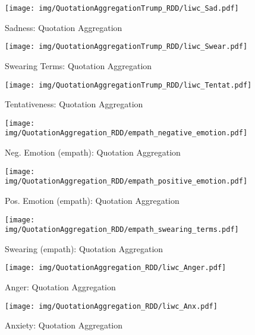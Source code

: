 \begin{figure}[h]\centering
\texttt{[image: img/QuotationAggregationTrump\_RDD/liwc\_Sad.pdf]}
\caption{Sadness: Quotation Aggregation}
\label{fig: qa_Sadness}
\end{figure}

\begin{figure}[h]\centering
\texttt{[image: img/QuotationAggregationTrump\_RDD/liwc\_Swear.pdf]}
\caption{Swearing Terms: Quotation Aggregation}
\label{fig: qa_Swearing Terms}
\end{figure}

\begin{figure}[h]\centering
\texttt{[image: img/QuotationAggregationTrump\_RDD/liwc\_Tentat.pdf]}
\caption{Tentativeness: Quotation Aggregation}
\label{fig: qa_Tentativeness}
\end{figure}

\clearpage
\pagebreak

\begin{figure}[h]\centering
\texttt{[image: img/QuotationAggregation\_RDD/empath\_negative\_emotion.pdf]}
\caption{Neg. Emotion (empath): Quotation Aggregation}
\label{fig: qa_Neg. Emotion (empath)}
\end{figure}

\begin{figure}[h]\centering
\texttt{[image: img/QuotationAggregation\_RDD/empath\_positive\_emotion.pdf]}
\caption{Pos. Emotion (empath): Quotation Aggregation}
\label{fig: qa_Pos. Emotion (empath)}
\end{figure}

\begin{figure}[h]\centering
\texttt{[image: img/QuotationAggregation\_RDD/empath\_swearing\_terms.pdf]}
\caption{Swearing (empath): Quotation Aggregation}
\label{fig: qa_Swearing (empath)}
\end{figure}

\begin{figure}[h]\centering
\texttt{[image: img/QuotationAggregation\_RDD/liwc\_Anger.pdf]}
\caption{Anger: Quotation Aggregation}
\label{fig: qa_Anger}
\end{figure}

\begin{figure}[h]\centering
\texttt{[image: img/QuotationAggregation\_RDD/liwc\_Anx.pdf]}
\caption{Anxiety: Quotation Aggregation}
\label{fig: qa_Anxiety}
\end{figure}

